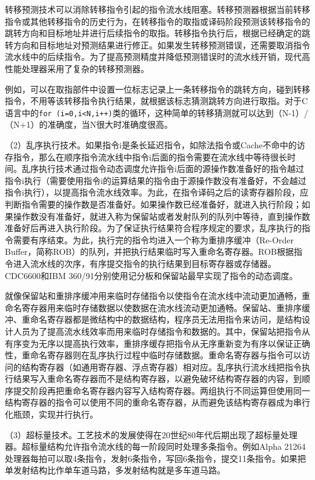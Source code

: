 \documentclass[]{ctexbook}
\begin{document}
转移预测技术可以消除转移指令引起的指令流水线阻塞。转移预测器根据当前转移指令或其他转移指令的历史行为，在转移指令的取指或译码阶段预测该转移指令的跳转方向和目标地址并进行后续指令的取指。转移指令执行后，根据已经确定的跳转方向和目标地址对预测结果进行修正。如果发生转移预测错误，还需要取消指令流水线中的后续指令。为了提高预测精度并降低预测错误时的流水线开销，现代高性能处理器采用了复杂的转移预测器。

例如，可以在取指部件中设置一位标志记录上一条转移指令的跳转方向，碰到转移指令，不用等该转移指令执行结果，就根据该标志猜测跳转方向进行取指。对于C语言中的\texttt{for\ (i=0,i\textless{}N,i++)}类的循环，这种简单的转移猜测就可以达到（N-1）/（N+1）的准确度，当N很大时准确度很高。

（2）乱序执行技术。如果指令i是条长延迟指令，如除法指令或Cache不命中的访存指令，那么在顺序指令流水线中指令i后面的指令需要在流水线中等待很长时间。乱序执行技术通过指令动态调度允许指令i后面的源操作数准备好的指令越过指令i执行（需要使用指令i的运算结果的指令由于源操作数没有准备好，不会越过指令i执行），以提高指令流水线效率。为此，在指令译码之后的读寄存器阶段，应判断指令需要的操作数是否准备好。如果操作数已经准备好，就进入执行阶段；如果操作数没有准备好，就进入称为保留站或者发射队列的队列中等待，直到操作数准备好后再进入执行阶段。为了保证执行结果符合程序规定的要求，乱序执行的指令需要有序结束。为此，执行完的指令均进入一个称为重排序缓冲（Re-Order Buffer，简称ROB）的队列，并把执行结果临时写入重命名寄存器。ROB根据指令进入流水线的次序，有序提交指令的执行结果到目标寄存器或存储器。CDC6600和IBM 360/91分别使用记分板和保留站最早实现了指令的动态调度。

就像保留站和重排序缓冲用来临时存储指令以使指令在流水线中流动更加通畅，重命名寄存器用来临时存储数据以使数据在流水线流动更加通畅。保留站、重排序缓冲、重命名寄存器都是微结构中的数据结构，程序员无法用指令来访问，是结构设计人员为了提高流水线效率而用来临时存储指令和数据的。其中，保留站把指令从有序变为无序以提高执行效率，重排序缓存把指令从无序重新变为有序以保证正确性，重命名寄存器则在乱序执行过程中临时存储数据。重命名寄存器与指令可以访问的结构寄存器（如通用寄存器、浮点寄存器）相对应。乱序执行流水线把指令执行结果写入重命名寄存器而不是结构寄存器，以避免破坏结构寄存器的内容，到顺序提交阶段再把重命名寄存器内容写入结构寄存器。两组执行不同运算但使用同一结构寄存器的指令可以使用不同的重命名寄存器，从而避免该结构寄存器成为串行化瓶颈，实现并行执行。

（3）超标量技术。工艺技术的发展使得在20世纪80年代后期出现了超标量处理器。超标量结构允许指令流水线的每一阶段同时处理多条指令。例如Alpha 21264处理器每拍可以取4条指令，发射6条指令，写回6条指令，提交11条指令。如果把单发射结构比作单车道马路，多发射结构就是多车道马路。
\end{document}
